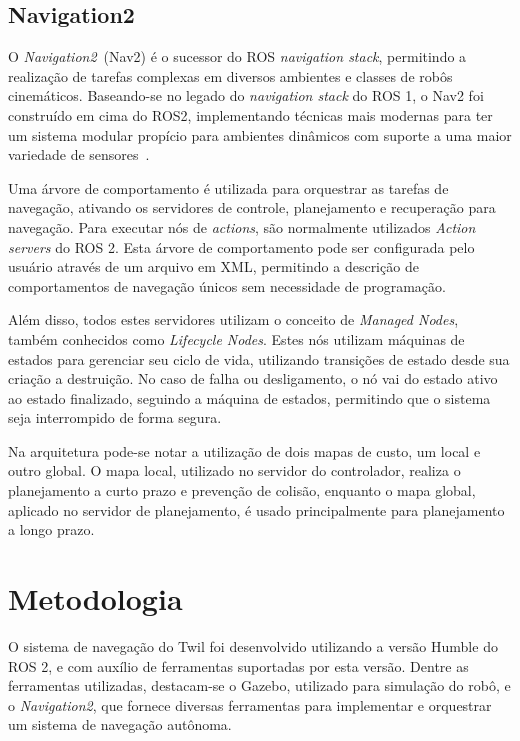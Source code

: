 \documentclass[repeatfields,xlists,xpacks,oneside,yearsonly]{ufrgscca}
\begin{document}
\section{Navigation2}

O \textit{Navigation2}~(Nav2) é o sucessor do ROS \textit{navigation
    stack}, permitindo a realização de tarefas complexas em diversos
ambientes e classes de robôs cinemáticos. Baseando-se no legado do
\textit{navigation stack} do ROS 1, o Nav2 foi construído em cima do
ROS2, implementando técnicas mais modernas para ter um sistema
modular propício para ambientes dinâmicos com suporte a uma maior
variedade de sensores~\cite{Nav2}.

Uma árvore de comportamento é utilizada para orquestrar as tarefas de
navegação, ativando os servidores de controle, planejamento e
recuperação para navegação. Para executar nós de \textit{actions},
são normalmente utilizados \textit{Action servers} do ROS 2. Esta
árvore de comportamento pode ser configurada pelo usuário através de
um arquivo em XML, permitindo a descrição de comportamentos de
navegação únicos sem necessidade de programação.

Além disso, todos estes servidores utilizam o conceito de
\textit{Managed Nodes}, também conhecidos como \textit{Lifecycle
    Nodes}. Estes nós utilizam máquinas de estados para gerenciar seu
ciclo de vida, utilizando transições de estado desde sua criação a
destruição. No caso de falha ou desligamento, o nó vai do estado
ativo ao estado finalizado, seguindo a máquina de estados, permitindo
que o sistema seja interrompido de forma segura.

Na arquitetura pode-se notar a utilização de dois mapas de custo, um
local e outro global. O mapa local, utilizado no servidor do
controlador, realiza o planejamento a curto prazo e prevenção de
colisão, enquanto o mapa global, aplicado no servidor de
planejamento, é usado principalmente para planejamento a longo prazo.

\chapter{Metodologia}
\label{desenvolvimento}

O sistema de navegação do Twil foi desenvolvido utilizando a versão
Humble do ROS 2, e com auxílio de ferramentas suportadas por esta
versão. Dentre as ferramentas utilizadas, destacam-se o Gazebo,
utilizado para simulação do robô, e o \textit{Navigation2}, que
fornece diversas ferramentas para implementar e orquestrar um sistema
de navegação autônoma.
\end{document}
